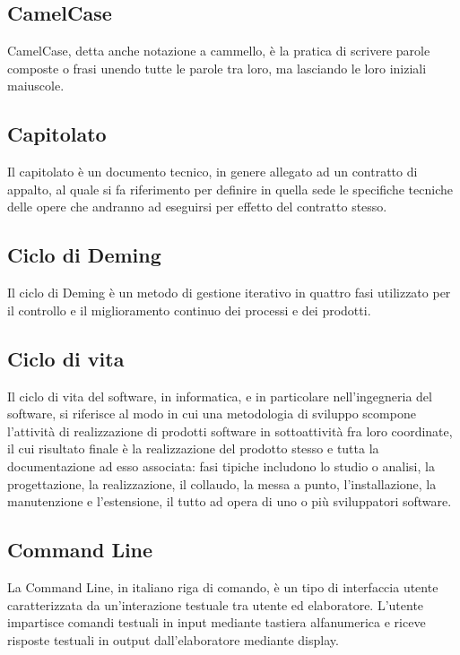 
\subsection*{CamelCase}
CamelCase, detta anche notazione a cammello, è la pratica di scrivere parole composte o frasi unendo tutte le parole tra loro, ma lasciando le loro iniziali maiuscole.
\subsection*{Capitolato}
Il capitolato è un documento tecnico, in genere allegato ad un contratto di appalto, al quale si fa riferimento per definire in quella sede le specifiche tecniche delle opere che andranno ad eseguirsi per effetto del contratto stesso.

\subsection*{Ciclo di Deming}
Il ciclo di Deming è un metodo di gestione iterativo in quattro fasi utilizzato per il controllo e il miglioramento continuo dei processi e dei prodotti.

\subsection*{Ciclo di vita}
Il ciclo di vita del software, in informatica, e in particolare nell'ingegneria del software, si riferisce al modo in cui una metodologia di sviluppo scompone l'attività di realizzazione di prodotti software in sottoattività fra loro coordinate, il cui risultato finale è la realizzazione del prodotto stesso e tutta la documentazione ad esso associata: fasi tipiche includono lo studio o analisi, la progettazione, la realizzazione, il collaudo, la messa a punto, l'installazione, la manutenzione e l'estensione, il tutto ad opera di uno o più sviluppatori software.

\subsection*{Command Line}
La Command Line, in italiano riga di comando, è un tipo di interfaccia utente caratterizzata da un'interazione testuale tra utente ed elaboratore. L'utente impartisce comandi testuali in input mediante tastiera alfanumerica e riceve risposte testuali in output dall'elaboratore mediante display.


